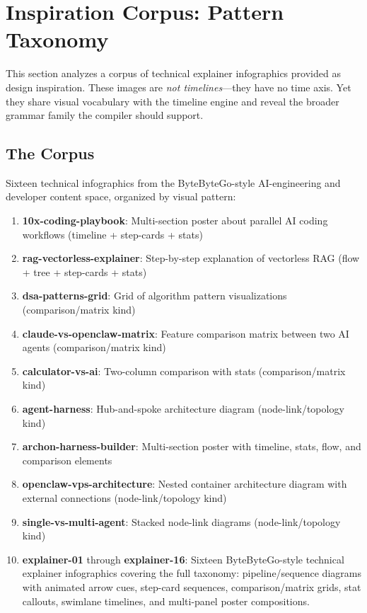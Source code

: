 \section{Inspiration Corpus: Pattern Taxonomy}
\label{sec:corpus-taxonomy}

This section analyzes a corpus of technical explainer infographics provided as design inspiration. These images are \emph{not timelines}---they have no time axis. Yet they share visual vocabulary with the timeline engine and reveal the broader grammar family the compiler should support.

\subsection{The Corpus}

Sixteen technical infographics from the ByteByteGo-style AI-engineering and
developer content space, organized by visual pattern:

\begin{enumerate}
  \item \textbf{10x-coding-playbook}: Multi-section poster about parallel AI
        coding workflows (timeline + step-cards + stats)
  \item \textbf{rag-vectorless-explainer}: Step-by-step explanation of
        vectorless RAG (flow + tree + step-cards + stats)
  \item \textbf{dsa-patterns-grid}: Grid of algorithm pattern visualizations
        (comparison/matrix kind)
  \item \textbf{claude-vs-openclaw-matrix}: Feature comparison matrix between
        two AI agents (comparison/matrix kind)
  \item \textbf{calculator-vs-ai}: Two-column comparison with stats
        (comparison/matrix kind)
  \item \textbf{agent-harness}: Hub-and-spoke architecture diagram
        (node-link/topology kind)
  \item \textbf{archon-harness-builder}: Multi-section poster with timeline,
        stats, flow, and comparison elements
  \item \textbf{openclaw-vps-architecture}: Nested container architecture
        diagram with external connections (node-link/topology kind)
  \item \textbf{single-vs-multi-agent}: Stacked node-link diagrams
        (node-link/topology kind)
  \item \textbf{explainer-01} through \textbf{explainer-16}: Sixteen
        ByteByteGo-style technical explainer infographics covering the full
        taxonomy: pipeline/sequence diagrams with animated arrow cues,
        step-card sequences, comparison/matrix grids, stat callouts,
        swimlane timelines, and multi-panel poster compositions.
\end{enumerate}

